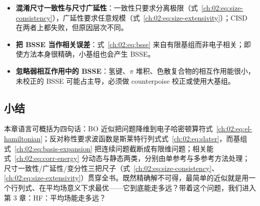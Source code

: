 \begin{pitfall}
\begin{itemize}
  \item \textbf{混淆尺寸一致性与尺寸广延性}：一致性只要求分离极限（式~\eqref{ch:02:eq:size-consistency}），广延性要求任意规模（式~\eqref{ch:02:eq:size-extensivity}）；CISD 在两者上都失败，但原因层次不同。
  \item \textbf{把 BSSE 当作相关误差}：式~\eqref{ch:02:eq:bsse} 来自有限基组而非电子相关；即使方法本身很精确，小基组也会产生 BSSE。
  \item \textbf{忽略弱相互作用中的 BSSE}：氢键、$\pi$ 堆积、色散复合物的相互作用能很小，未校正的 BSSE 可能占主导，必须做 counterpoise 校正或使用大基组。
\end{itemize}
\end{pitfall}

\subsection*{小结}
本章语言可概括为四句话：BO 近似把问题降维到电子哈密顿算符式~\eqref{ch:02:eq:el-hamiltonian}；反对称性要求波函数是斯莱特行列式式~\eqref{ch:02:eq:slater}，而基组式~\eqref{ch:02:eq:basis-expansion} 把连续问题截断成有限维问题；相关能式~\eqref{ch:02:eq:corr-energy} 分动态与静态两类，分别由单参考与多参考方法处理；尺寸一致性/广延性/变分性三把尺子（式~\eqref{ch:02:eq:size-consistency}、\eqref{ch:02:eq:size-extensivity}）贯穿全书。既然精确解不可得，最简单的近似就是用一个行列式、在平均场意义下求最优——它到底能走多远？带着这个问题，我们进入第 3 章：HF：平均场能走多远？
